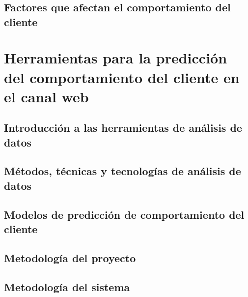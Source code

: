 \documentclass{report}
\begin{document}
\subsection{Factores que afectan el comportamiento del cliente}


\section{Herramientas para la predicción del comportamiento del cliente en el canal web}

\subsection{Introducción a las herramientas de análisis de datos}


\subsection{Métodos, técnicas y tecnologías de análisis de datos}


\subsection{Modelos de predicción de comportamiento del cliente}




\subsection{Metodología del proyecto}


\subsection{Metodología del sistema}

\end{document}
